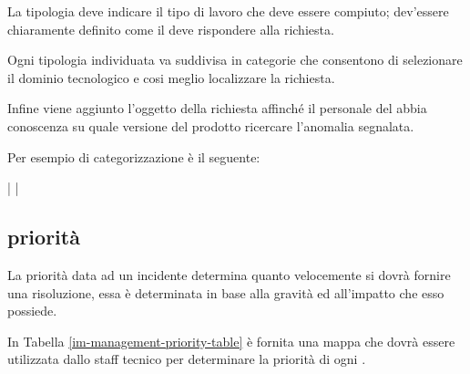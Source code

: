 La tipologia deve indicare il tipo di lavoro che deve essere compiuto; dev'essere chiaramente definito come il  deve rispondere alla richiesta.

Ogni tipologia individuata va suddivisa in categorie che consentono di selezionare il dominio tecnologico e cosi meglio localizzare la richiesta.

Infine viene aggiunto l'oggetto  della richiesta affinché il personale del  abbia conoscenza su quale versione del prodotto ricercare l'anomalia segnalata.

Per esempio di categorizzazione è il seguente:

\begin{center}
 |  | 
\end{center}

\subsection[Priorità]{priorità}
\label{im-management-priority}
La priorità data ad un incidente determina quanto velocemente si dovrà fornire una risoluzione, essa è determinata in base alla gravità ed all'impatto che esso possiede.

In Tabella \ref{im-management-priority-table} è fornita una mappa che dovrà essere utilizzata dallo staff tecnico per determinare la priorità di ogni .

